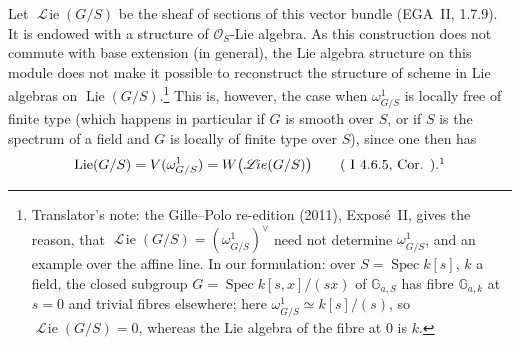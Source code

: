 %
Let \(\mathop{\mathscr L\!ie}(G/S)\) be the sheaf of sections of this
vector bundle (EGA~II, 1.7.9). It is endowed with a structure of
\(\mathcal O_S\)-Lie algebra. As this construction does not commute with
base extension (in general), the Lie algebra structure on this module does
not make it possible to reconstruct the structure of scheme in Lie
algebras on \(\operatorname{Lie}(G/S)\).\footnote{Translator's note: the
Gille--Polo re-edition (2011), Expos\'e~II, gives the reason, that
\(\mathop{\mathscr L\!ie}(G/S)=(\omega^1_{G/S})^\vee\) need not determine
\(\omega^1_{G/S}\), and an example over the affine line. In our
formulation: over \(S=\operatorname{Spec}k[s]\), \(k\) a field, the closed
subgroup \(G=\operatorname{Spec}k[s,x]/(sx)\) of \(\mathbb G_{a,S}\) has
fibre \(\mathbb G_{a,k}\) at \(s=0\) and trivial fibres elsewhere; here
\(\omega^1_{G/S}\simeq k[s]/(s)\), so \(\mathop{\mathscr L\!ie}(G/S)=0\),
whereas the Lie algebra of the fibre at \(0\) is \(k\).}
This is, however, the case when
\(\omega^1_{G/S}\) is locally free of finite type (which happens in
particular if \(G\) is smooth over \(S\), or if \(S\) is the spectrum of a
field and \(G\) is locally of finite type over \(S\)), since one then has
\[
 \operatorname{Lie}(G/S)=V(\omega^1_{G/S})
 =W\bigl(\mathop{\mathscr L\!ie}(G/S)\bigr)
 \qquad\textup{(\SGARefLink{sga3:i:corollary:4-6-5-1}{I~4.6.5, Cor.})}.\footnotemark
\]


